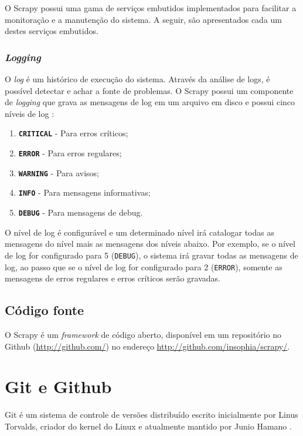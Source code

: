 O Scrapy possui uma gama de serviços embutidos implementados para facilitar a monitoração e a manutenção do sistema. A seguir, são apresentados cada um destes serviços embutidos.

\subsubsection{\textit{Logging}}

O \textit{log} é um histórico de execução do sistema. Através da análise de logs, é possível detectar e achar a fonte de problemas. O Scrapy possui um componente de \textit{logging} que grava as mensagens de log em um arquivo em disco e possui cinco níveis de log \cite{scrapy_log}:

\begin{enumerate}
	\item \texttt{\textbf{CRITICAL}} - Para erros críticos;
	\item \texttt{\textbf{ERROR}} - Para erros regulares;
	\item \texttt{\textbf{WARNING}} - Para avisos;
	\item \texttt{\textbf{INFO}} - Para mensagens informativas;
	\item \texttt{\textbf{DEBUG}} - Para mensagens de debug.
\end{enumerate}

O nível de log é configurável e um determinado nível irá catalogar todas as mensagens do nível mais as mensagens dos níveis abaixo. Por exemplo, se o nível de log for configurado para 5 (\texttt{DEBUG}), o sistema irá gravar todas as mensagens de log, ao passo que se o nível de log for configurado para 2 (\texttt{ERROR}), somente as mensagens de erros regulares e erros críticos serão gravadas.

\subsection{Código fonte}

O Scrapy é um \emph{framework} de código aberto, disponível em um repositório no Github (\url{http://github.com/}) no endereço \url{http://github.com/insophia/scrapy/}.

\pagebreak
\section{Git e Github}

Git é um sistema de controle de versões distribuído escrito inicialmente por Linus Torvalds, criador do kernel do Linux e atualmente mantido por Junio Hamano \cite{progit}.

